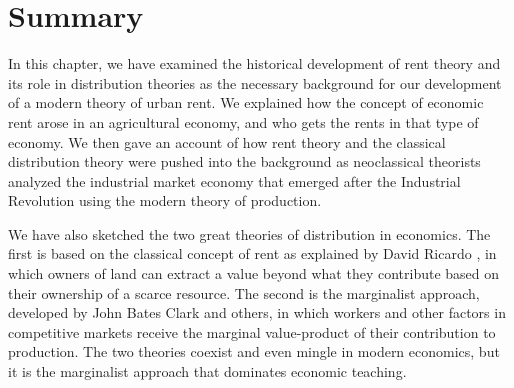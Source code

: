  
\section{Summary}



In this chapter, we have examined the historical development of rent theory and its role in distribution theories as the necessary background for our development of a modern theory of urban rent. We explained how the concept of economic rent arose in an agricultural economy, and who gets the rents in that type of economy. We then gave an account of how rent theory and the classical distribution theory were pushed into the background as neoclassical theorists analyzed the industrial market economy that emerged after the Industrial Revolution using the modern theory of production. 

We have also sketched the two great theories of \gls{distribution} in economics. The first is based on the classical concept of rent as explained by David Ricardo \cite{ricardoEssayInfluenceLow1815}, in which owners of land can extract a value beyond what they contribute based on their ownership of a scarce resource. The second is the marginalist approach, developed by John Bates Clark and others, in which workers and other factors in competitive markets receive the \gls{marginal value-product} of their contribution to production. The two theories coexist and even mingle in modern economics, but it is the marginalist approach that dominates economic teaching. 

